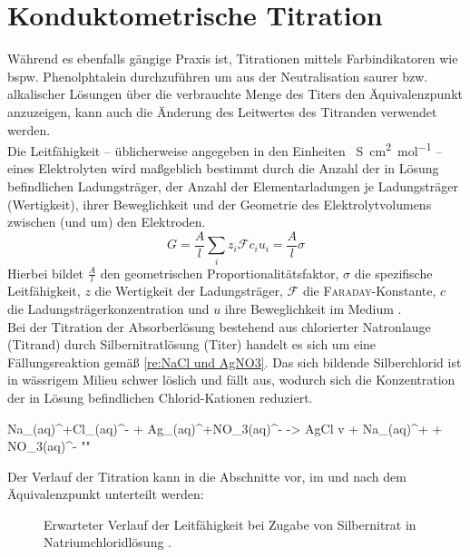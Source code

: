 	\section*{Konduktometrische Titration}
		Während es ebenfalls gängige Praxis ist, Titrationen mittels Farbindikatoren wie bspw. Phenolphtalein durchzuführen um aus der Neutralisation
		saurer bzw. alkalischer Lösungen über die verbrauchte Menge des Titers den Äquivalenzpunkt anzuzeigen, kann auch die Änderung des Leitwertes
		des Titranden verwendet werden.\\
		Die Leitfähigkeit -- üblicherweise angegeben in den Einheiten \SI{}{\siemens\centi\metre\squared\per\mole} -- eines Elektrolyten wird maßgeblich bestimmt durch die Anzahl der
		in Lösung befindlichen Ladungsträger, der Anzahl der Elementarladungen je Ladungsträger (Wertigkeit), ihrer Beweglichkeit und der Geometrie des Elektrolytvolumens zwischen
		(und um) den Elektroden.
		\begin{equation}
			G = \frac{A}{l} \sum_i z_i \mathcal{F}c_i u_i = \frac{A}{l} \sigma
			\label{eq:leitfaehigkeit}
		\end{equation}
		Hierbei bildet \(\frac{A}{l}\) den geometrischen Proportionalitätsfaktor, \(\sigma\) die spezifische Leitfähigkeit, \(z\) die Wertigkeit der Ladungsträger, \(\mathcal{F}\) die \textsc{Faraday}-Konstante,
		\(c\) die Ladungsträgerkonzentration und \(u\) ihre Beweglichkeit im Medium \cite{Job.2021.physikalische.chemie}.\\
		Bei der Titration der Absorberlösung bestehend aus chlorierter Natronlauge (Titrand) durch Silbernitratlösung (Titer) handelt es sich um eine Fällungsreaktion gemäß
		\cref{re:NaCl und AgNO3}. Das sich bildende Silberchlorid ist in wässrigem Milieu schwer löslich und fällt aus, wodurch sich die Konzentration
		der in Lösung befindlichen Chlorid-Kationen reduziert.
		\begin{reaction}
			Na_{(aq)}^{+}Cl_{(aq)}^{-} + Ag_{(aq)}^{+}NO_{3(aq)}^{-} -> AgCl v + Na_{(aq)}^{+} + NO_{3(aq)}^{-} "\label{re:NaCl und AgNO3}"
		\end{reaction}
		Der Verlauf der Titration kann in die Abschnitte vor, im und nach dem Äquivalenzpunkt unterteilt werden:\par
		\begin{figure}[h]
			\centering
			
			\caption[Erwarteter Verlauf der Leitfähigkeit]{Erwarteter Verlauf der Leitfähigkeit bei Zugabe von Silbernitrat in Natriumchloridlösung \cite{Job.2021.physikalische.chemie}.}
			\label{fig:erwarteter verlauf der leitfaehigkeit}
		\end{figure}
